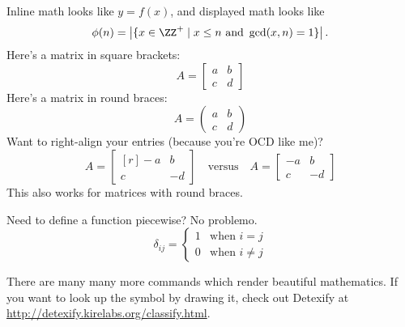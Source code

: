 Inline math looks like $y=f(x)$, and displayed math looks like
\[
\phi(n)=\left|\{x\in\ZZ^+\mid x\leq n\text{ and }\gcd(x,n)=1\}\right|.
\]
Here's a matrix in square brackets:
\[
A=\begin{bmatrix}a&b\\c&d\end{bmatrix}
\]
Here's a matrix in round braces:
\[
A=\begin{pmatrix}a&b\\c&d\end{pmatrix}
\]
Want to right-align your entries (because you're OCD like me)?
\[
A=\begin{bmatrix*}[r]-a&b\\c&-d\end{bmatrix*}\quad\text{versus}\quad A=\begin{bmatrix}-a&b\\c&-d\end{bmatrix}
\]
This also works for matrices with round braces.

Need to define a function piecewise? No problemo.
\[
\delta_{ij}=
\begin{cases}
1& \text{when } i=j\\
0& \text{when } i\neq j
\end{cases}
\]

There are many many more commands which render beautiful mathematics. If you want to look up the symbol by drawing it, check out Detexify at \url{http://detexify.kirelabs.org/classify.html}.


